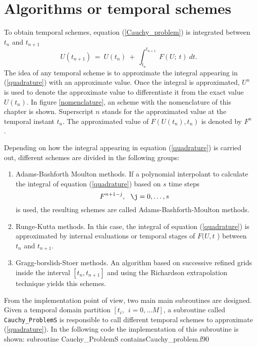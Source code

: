 \section{Algorithms or temporal schemes}
To obtain temporal schemes,  equation (\ref{Cauchy_problem}) is integrated between  $t_{n}$ and $t_{n + 1}$
 \begin{equation}
 \displaystyle
 U (t_{n + 1}) \ = \ U (t_{n}) \ + \ \int_{t_{n}}^{t_{n + 1}} \ F (U; \ t) \ dt. 
 \label{quadrature}
 \end{equation} 
The idea of any temporal scheme is to approximate the integral appearing in (\ref{quadrature}) with an approximate value. 
Once the integral is approximated, $ U^n $ is used to denote the approximate value to differentiate it from the exact value 
$ U(t_n) $.
In figure \ref{nomenclature}, an scheme with the nomenclature of this chapter is shown. Superscript $n$ stands for the approximated value at the temporal instant $ t_n $. The approximated value of $ F(U(t_n), t_n) $ is denoted by $ F^n $. 
 
 \nomenclature 
\vspace{-1cm}   
Depending on how the integral appearing in equation (\ref{quadrature})  is carried out, different schemes are divided in the following groups: 
  \begin{enumerate}
  \item Adams-Bashforth Moulton methods. 
   If a polynomial interpolant to calculate  the integral of equation (\ref{quadrature})  based on $ s $ time steps 
   $$ F^{n+1-j},  \ \ \j=0, \ldots, s
   $$ 
   is used, the 
   resulting schemes are called Adams-Bashforth-Moulton methods.     
  
  \item Runge-Kutta methods. In this case, the integral of equation (\ref{quadrature}) is approximated by internal evaluations or 
  temporal stages
  of $F(U,t $ ) between $ t_n $ and $ t_{n+1} $.
  \item Gragg-borslish-Stoer methods. An algorithm based on successive refined grids inside the interval $ [t_n, t_{n+1} ]$ and using the Richardson extrapolation  technique yields this schemes. 
  \end{enumerate}     
 
From the implementation point of view, two main main subroutines are designed. 
Given a temporal domain partition $ [t_i, \ \ i=0, \ldots M ]$, a subroutine called \verb|Cauchy_ProblemS| is responsible to call different temporal schemes to approximate (\ref{quadrature}).
In the following code the implementation of this subroutine is shown: 
      \vspace{0.5cm} 
      {subroutine Cauchy_ProblemS}
      {contains}{Cauchy_problem.f90}
 
